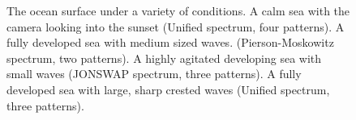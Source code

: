 \begin{figure}
	\centering
	\hfill
	\hfill
	\caption[Overview of results.]{The ocean surface under a variety of conditions.
		 A calm sea with the camera looking into the
		sunset (Unified spectrum, four patterns).
		 A fully developed sea with medium sized waves. (Pierson-Moskowitz spectrum, two patterns).
		 A highly agitated developing sea with small waves (JONSWAP spectrum, three patterns).
		 A fully developed sea with large, sharp crested waves (Unified spectrum, three patterns).
	}
	\label{fig:results:overview}
\end{figure}
